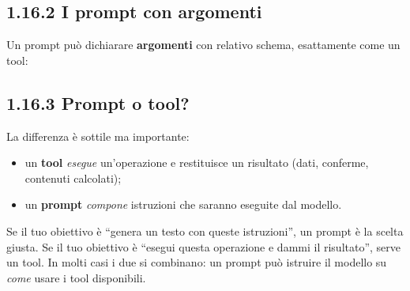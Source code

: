 \documentclass[
  italian,
  10pt,
]{book}
\newenvironment{Shaded}{\begin{snugshade}}{\end{snugshade}}
\newcommand{\DataTypeTok}[1]{\textcolor[rgb]{0.13,0.29,0.53}{#1}}
\newcommand{\FunctionTok}[1]{\textcolor[rgb]{0.13,0.29,0.53}{\textbf{#1}}}
\newcommand{\KeywordTok}[1]{\textcolor[rgb]{0.13,0.29,0.53}{\textbf{#1}}}
\newcommand{\NormalTok}[1]{#1}
\newcommand{\OperatorTok}[1]{\textcolor[rgb]{0.81,0.36,0.00}{\textbf{#1}}}
\newcommand{\SpecialCharTok}[1]{\textcolor[rgb]{0.81,0.36,0.00}{\textbf{#1}}}
\newcommand{\StringTok}[1]{\textcolor[rgb]{0.31,0.60,0.02}{#1}}
\providecommand{\tightlist}{%
  \setlength{\itemsep}{0pt}\setlength{\parskip}{0pt}}
\begin{document}
\subsection{1.16.2 I prompt con argomenti}\label{i-prompt-con-argomenti}

Un prompt può dichiarare \textbf{argomenti} con relativo schema,
esattamente come un tool:

\begin{Shaded}
\end{Shaded}

\subsection{1.16.3 Prompt o tool?}\label{prompt-o-tool}

La differenza è sottile ma importante:

\begin{itemize}
\tightlist
\item
  un \textbf{tool} \emph{esegue} un'operazione e restituisce un
  risultato (dati, conferme, contenuti calcolati);
\item
  un \textbf{prompt} \emph{compone} istruzioni che saranno eseguite dal
  modello.
\end{itemize}

Se il tuo obiettivo è ``genera un testo con queste istruzioni'', un
prompt è la scelta giusta. Se il tuo obiettivo è ``esegui questa
operazione e dammi il risultato'', serve un tool. In molti casi i due si
combinano: un prompt può istruire il modello su \emph{come} usare i tool
disponibili.
\end{document}

